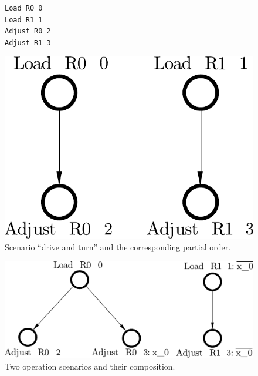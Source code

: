 \begin{figure}[H]
\vspace{-5mm}
\centering
  \begin{minipage}[b]{0.5\textwidth}
\begin{verbatim}
Load R0 0
Load R1 1
Adjust R0 2
Adjust R1 3
\end{verbatim}
\vspace{3mm}
\end{minipage}
\begin{minipage}[b]{0.4\textwidth}
\includegraphics[scale=0.35]{img/ataed-scenario-turn.pdf}
\end{minipage}
\vspace{-3mm}
\caption{Scenario ``drive and turn'' and the corresponding
partial order.\label{fig-scenarios-turn}}
\vspace{-8mm}
\end{figure}

\begin{figure}[H]
\vspace{-5mm}
\centerline{\includegraphics[scale=0.35]{img/ataed-composition.pdf}}
\vspace{-2mm}
\caption{Two operation scenarios and their composition.\label{fig-scenarios-composition}}
\vspace{-7mm}
\end{figure}

